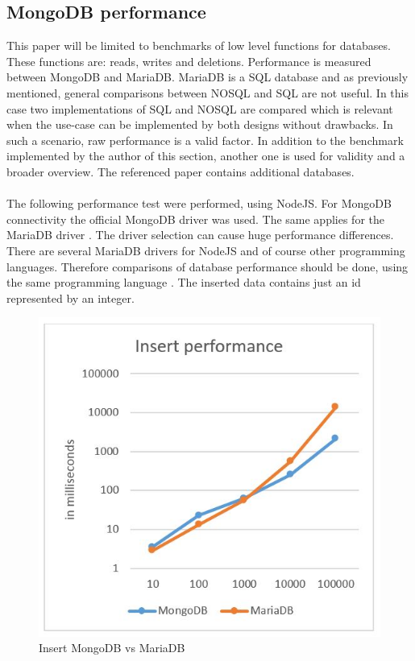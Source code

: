 \subsection{MongoDB performance}
This paper will be limited to benchmarks of low level functions for databases. These functions are: reads, writes and deletions. Performance is measured between MongoDB and MariaDB. MariaDB is a SQL database and as previously mentioned, general comparisons between NOSQL and SQL are not useful. In this case two implementations of SQL and NOSQL are compared which is relevant when the use-case can be implemented by both designs without drawbacks. In such a scenario, raw performance is a valid factor.
In addition to the benchmark implemented by the author of this section, another one is used for validity and a broader overview. The referenced paper contains additional databases.
\\\\
The following performance test were performed, using NodeJS. For MongoDB connectivity the official MongoDB driver  was used. The same applies for the MariaDB driver . The driver selection can cause huge performance differences. There are several MariaDB drivers for NodeJS and of course other programming languages. Therefore comparisons of database performance should be done, using the same programming language \cite{_mscdex.}. The inserted data contains just an id represented by an integer.
\begin{figure}[H]
\includegraphics[width=\linewidth,keepaspectratio]{images/Performance_Inserts.JPG}
\caption{Insert MongoDB vs MariaDB}
\label{arch-example}
\end{figure}
